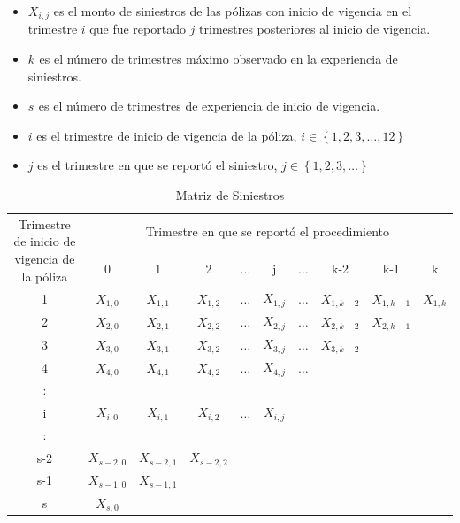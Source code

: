 \documentclass[11pt,twoside,openright,spanish]{report}
\numberwithin{equation}{chapter}
\numberwithin{figure}{chapter}
\numberwithin{table}{chapter}
\begin{document}
	\vspace{0.1cm}
	
	\begin{itemize}
		\setlength\itemsep{-0.5em}
		\item ${X}_{i,j}$ es el monto de siniestros de las pólizas con inicio de vigencia en el trimestre $i$ que fue reportado $j$ trimestres posteriores al inicio de vigencia.
		\item ${k}_{}$ es el número de trimestres máximo observado en la experiencia de siniestros.
		\item ${s}_{}$ es el número de trimestres de experiencia de inicio de vigencia.
		\item $i$ es el trimestre de inicio de vigencia de la póliza, $i\in \left\{1,2,3,\dots ,12\right\}$
		\item $j$ es el trimestre en que se reportó el siniestro,  $j\in \left\{1,2,3,\dots\right\}$
	\end{itemize}
	
	\vspace{1cm}

	\begin{table}[ht]
	\centering
	\begin{tabularx}{\linewidth}{c|ccccccccc}
		\multirow{2}{4cm}{Trimestre de inicio de vigencia de la póliza} & \multicolumn{9}{c}{Trimestre en que se reportó el procedimiento} \\
			& 0  & 1 & 2 & $ \dots $ & j & $\dots $ & k-2 & k-1 &  k \\
		\midrule
		1      &  $X_{1,0}^{}$ & $X_{1,1}^{}$ & $X_{1,2}^{}$ & $ \dots $ & $X_{1,j}^{}$ & $ \dots $ & $X_{1,k-2}^{}$ & $X_{1,k-1}^{}$ & $X_{1,k}^{}$ \\
		2      &  $X_{2,0}^{}$ & $X_{2,1}^{}$ & $X_{2,2}^{}$ & $ \dots $ & $X_{2,j}^{}$ & $ \dots $ & $X_{2,k-2}^{}$ & $X_{2,k-1}^{}$ & \\
		3      &  $X_{3,0}^{}$ & $X_{3,1}^{}$ & $X_{3,2}^{}$ & $ \dots $ & $X_{3,j}^{}$ & $ \dots $ & $X_{3,k-2}^{}$ & & \\
		4      &  $X_{4,0}^{}$ & $X_{4,1}^{}$ & $X_{4,2}^{}$ & $ \dots $ & $X_{4,j}^{}$ & $ \dots $ & & & \\
		:      & & & & & & & & &\\
		i      &  $X_{i,0}^{}$ & $X_{i,1}^{}$ & $X_{i,2}^{}$ & $ \dots $ & $X_{i,j}^{}$ & & & & \\
		:      & & & & & & & & & \\
		s-2      &  $X_{s-2,0}^{}$ & $X_{s-2,1}^{}$ & $X_{s-2,2}^{}$ & & & & & & \\
		s-1      &  $X_{s-1,0}^{}$ & $X_{s-1,1}^{}$ & & & & & & & \\
		s      &  $X_{s,0}^{}$ & & & & & & & & \\
	\end{tabularx}
\caption{Matriz de Siniestros}
\label{matrix1}
	\end{table}
\end{document}
